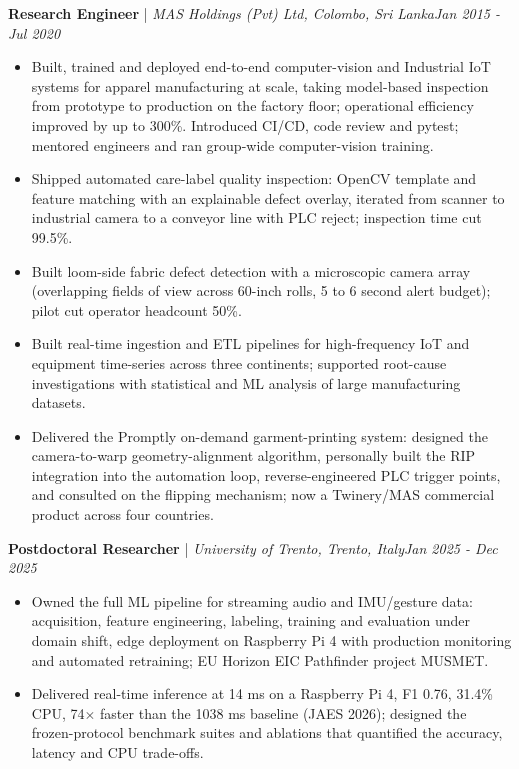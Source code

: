 \documentclass[11pt]{article}
\newenvironment{cvrole}[5]{%
  \par\noindent\textbf{\large #1} | \textit{\small #2, #3}\hfill \textit{\small #4 - #5}\par
  \begin{itemize}[leftmargin=2em, itemsep=-0.3em, topsep=-0.5em]%
}{%
  \end{itemize}\par\noindent\mbox{}\par\vspace{0.1em}%
}
\begin{document}
\begin{cvrole}{Research Engineer}{MAS Holdings (Pvt) Ltd}{Colombo, Sri Lanka}{Jan 2015}{Jul 2020}
    \item Built, trained and deployed end-to-end computer-vision and Industrial IoT systems for apparel manufacturing at scale, taking model-based inspection from prototype to production on the factory floor; operational efficiency improved by up to 300\%. Introduced CI/CD, code review and pytest; mentored engineers and ran group-wide computer-vision training.
    \item Shipped automated care-label quality inspection: OpenCV template and feature matching with an explainable defect overlay, iterated from scanner to industrial camera to a conveyor line with PLC reject; inspection time cut 99.5\%.
    \item Built loom-side fabric defect detection with a microscopic camera array (overlapping fields of view across 60-inch rolls, 5 to 6 second alert budget); pilot cut operator headcount 50\%.
    \item Built real-time ingestion and ETL pipelines for high-frequency IoT and equipment time-series across three continents; supported root-cause investigations with statistical and ML analysis of large manufacturing datasets.
    \item Delivered the Promptly on-demand garment-printing system: designed the camera-to-warp geometry-alignment algorithm, personally built the RIP integration into the automation loop, reverse-engineered PLC trigger points, and consulted on the flipping mechanism; now a Twinery/MAS commercial product across four countries.
\end{cvrole}

\begin{cvrole}{Postdoctoral Researcher}{University of Trento}{Trento, Italy}{Jan 2025}{Dec 2025}
    \item Owned the full ML pipeline for streaming audio and IMU/gesture data: acquisition, feature engineering, labeling, training and evaluation under domain shift, edge deployment on Raspberry Pi 4 with production monitoring and automated retraining; EU Horizon EIC Pathfinder project MUSMET.
    \item Delivered real-time inference at 14 ms on a Raspberry Pi 4, F1 0.76, 31.4\% CPU, 74$\times$ faster than the 1038 ms baseline (JAES 2026); designed the frozen-protocol benchmark suites and ablations that quantified the accuracy, latency and CPU trade-offs.
\end{cvrole}
\end{document}
